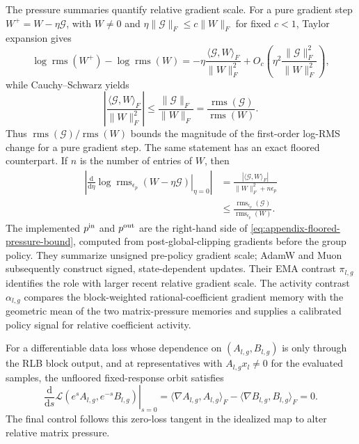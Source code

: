 \documentclass{article}
\newcommand{\rms}{\operatorname{rms}}
\begin{document}
The pressure summaries quantify relative gradient scale.  For a pure gradient
step $W^+=W-\eta\mathcal G$, with $W\ne0$ and
$\eta\lVert\mathcal G\rVert_F\le c\lVert W\rVert_F$ for fixed $c<1$,
Taylor expansion gives
\begin{equation}
    \log\rms(W^+)-\log\rms(W)
    =
    -\eta
    \frac{\langle\mathcal{G},W\rangle_F}{\lVert W\rVert_F^2}
    +O_c\!\left(
    \eta^2\frac{\lVert\mathcal{G}\rVert_F^2}{\lVert W\rVert_F^2}
    \right),
    \label{eq:appendix-log-rms-update}
\end{equation}
while Cauchy--Schwarz yields
\begin{equation}
    \left|
    \frac{\langle\mathcal{G},W\rangle_F}{\lVert W\rVert_F^2}
    \right|
    \le
    \frac{\lVert\mathcal{G}\rVert_F}{\lVert W\rVert_F}
    =
    \frac{\rms(\mathcal{G})}{\rms(W)} .
    \label{eq:appendix-pressure-bound}
\end{equation}
Thus $\rms(\mathcal G)/\rms(W)$ bounds the magnitude of the first-order
log-RMS change for a pure gradient step.  The same statement has an exact
floored counterpart.  If $n$ is the number of entries of $W$, then
\begin{equation}
\begin{aligned}
    \left|
    \left.\frac{\mathrm d}{\mathrm d\eta}
    \log\rms_{\epsilon_p}(W-\eta\mathcal G)
    \right|_{\eta=0}
    \right|
    &=
    \frac{|\langle\mathcal G,W\rangle_F|}
         {\lVert W\rVert_F^2+n\epsilon_p}
    \\
    &\le
    \frac{\rms_{\epsilon_p}(\mathcal G)}
         {\rms_{\epsilon_p}(W)}.
\end{aligned}
    \label{eq:appendix-floored-pressure-bound}
\end{equation}
The implemented $p^{\rm in}$ and $p^{\rm out}$ are the right-hand side of
\eqref{eq:appendix-floored-pressure-bound}, computed from post-global-clipping
gradients before the group policy.  They summarize unsigned pre-policy gradient
scale; AdamW and Muon subsequently construct signed, state-dependent updates.
Their EMA contrast $\pi_{l,g}$ identifies the role with larger recent relative
gradient scale.  The activity contrast $\alpha_{l,g}$ compares the block-weighted
rational-coefficient gradient memory with the geometric mean of the two
matrix-pressure memories and supplies a calibrated policy signal for relative
coefficient activity.

For a differentiable data loss whose dependence on $(A_{l,g},B_{l,g})$ is only
through the RLB block output, and at representatives with
$A_{l,g}x_l\ne0$ for the evaluated samples, the unfloored fixed-response orbit
satisfies
\begin{equation}
    \left.
    \frac{\mathrm d}{\mathrm ds}
    \mathcal L(e^sA_{l,g},e^{-s}B_{l,g})
    \right|_{s=0}
    =
    \langle\nabla A_{l,g},A_{l,g}\rangle_F
    -
    \langle\nabla B_{l,g},B_{l,g}\rangle_F
    =0.
\end{equation}
The final control follows this zero-loss tangent in the idealized map to alter
relative matrix pressure.
\end{document}
